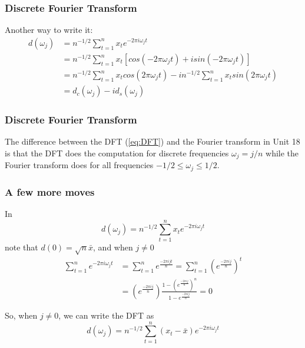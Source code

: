 \documentclass[%
xcolor=pdftex]{beamer}
\begin{document}
\begin{frame}
\frametitle{Discrete Fourier Transform}

Another way to write it:
\begin{align*}
d(\omega_j) &= n^{-1/2} \sum_{t=1}^n x_t e^{-2 \pi i \omega_j t} \\
&= n^{-1/2} \sum_{t=1}^n x_t [cos(-2 \pi  \omega_j t) + i sin(-2 \pi  \omega_j t)]\\
&= n^{-1/2} \sum_{t=1}^n x_t cos(2 \pi  \omega_j t) - i n^{-1/2} \sum_{t=1}^n x_t sin(2 \pi  \omega_j t) \\
&= d_c(\omega_j) - i d_s(\omega_j)
\end{align*}


\end{frame}



\begin{frame}
\frametitle{Discrete Fourier Transform}

The difference between the DFT (\ref{eq:DFT}) and the Fourier transform
in Unit 18 is that the DFT does the computation for
discrete frequencies $\omega_j = j/n$ while the Fourier transform does for
all frequencies $-1/2 \leq \omega_j \leq 1/2$.

\end{frame}

\begin{frame}
\frametitle{A few more moves}

In
$$
d(\omega_j)=n^{-1/2} \sum_{t=1}^n x_t e^{-2 \pi i \omega_j t}
$$
note that $d(0) = \sqrt{n} \bar{x}$, and when $j \neq 0$
\begin{align*}
\sum_{t=1}^n  e^{-2 \pi i \omega_j t} &= \sum_{t=1}^n  e^{\frac{-2 \pi i j t}{n} } = \sum_{t=1}^n  \left(e^{\frac{-2 \pi i  j}{n} }\right)^t \\
&= \left(e^{\frac{-2 \pi i  j}{n} }\right)\frac{1 - \left(e^{\frac{-2 \pi i  j}{n} }\right)^n}{ 1 - e^{\frac{-2 \pi i  j}{n} } }
= 0
\end{align*}

So, when $j \neq 0$, we can write the DFT as
$$
d(\omega_j)=n^{-1/2} \sum_{t=1}^n (x_t-\bar{x}) e^{-2 \pi i \omega_j t}
$$
\end{frame}



%
%
%
%
%
%
\end{document}
